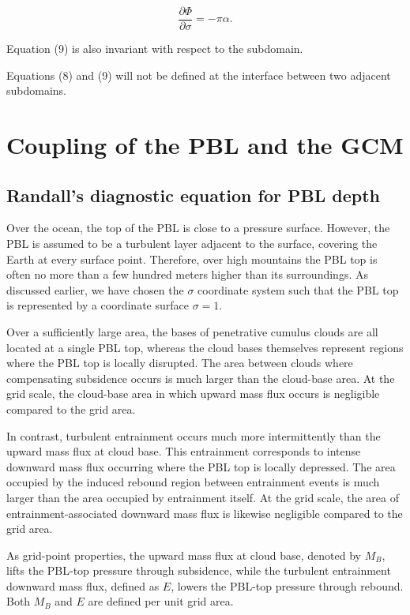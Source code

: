\documentclass[12pt,openany]{book}
\begin{document}
\begin{equation}
\frac{\partial \Phi}{\partial \sigma}
=
- \pi \alpha .
\tag{3.9}
\label{3.9}
\end{equation}

Equation (9) is also invariant with respect to the subdomain.

Equations (8) and (9) will not be defined at the interface between two
adjacent subdomains.

\chapter{Coupling of the PBL and the GCM}

\section{Randall's diagnostic equation for PBL depth}

Over the ocean, the top of the PBL is close to a pressure surface. However, the PBL is assumed to be a turbulent layer adjacent to the surface, covering the Earth at every surface point. Therefore, over high mountains the PBL top is often no more than a few hundred meters higher than its surroundings. As discussed earlier, we have chosen the $\sigma$ coordinate system such that the PBL top is represented by a coordinate surface $\sigma = 1$.

Over a sufficiently large area, the bases of penetrative cumulus clouds are all located at a single PBL top, whereas the cloud bases themselves represent regions where the PBL top is locally disrupted. The area between clouds where compensating subsidence occurs is much larger than the cloud-base area. At the grid scale, the cloud-base area in which upward mass flux occurs is negligible compared to the grid area.

In contrast, turbulent entrainment occurs much more intermittently than the upward mass flux at cloud base. This entrainment corresponds to intense downward mass flux occurring where the PBL top is locally depressed. The area occupied by the induced rebound region between entrainment events is much larger than the area occupied by entrainment itself. At the grid scale, the area of entrainment-associated downward mass flux is likewise negligible compared to the grid area.

As grid-point properties, the upward mass flux at cloud base, denoted by $M_B$, lifts the PBL-top pressure through subsidence, while the turbulent entrainment downward mass flux, defined as $E$, lowers the PBL-top pressure through rebound. Both $M_B$ and $E$ are defined per unit grid area.
\end{document}

